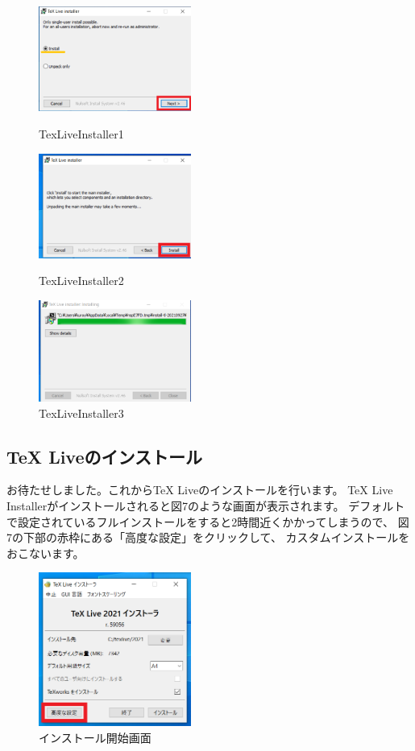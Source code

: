 \documentclass[dvipdfmx]{jsarticle}
\begin{document}
\begin{figure}[H]
    \begin{minipage}[b]{0.33\linewidth}
        \centering
        \includegraphics[width=5cm]{images/TeXLiveInstaller1.png}
        \caption{TexLiveInstaller1}
    \end{minipage}
    \begin{minipage}[b]{0.33\linewidth}
        \centering
        \includegraphics[width=5cm]{images/TeXLiveInstaller2.png}
        \caption{TexLiveInstaller2}
    \end{minipage}
    \begin{minipage}[b]{0.33\linewidth}
        \centering
        \includegraphics[width=5cm]{images/TeXLiveInstaller3.png}
        \caption{TexLiveInstaller3}
    \end{minipage}
\end{figure}

\subsection{TeX Liveのインストール}
お待たせしました。これからTeX Liveのインストールを行います。
TeX Live Installerがインストールされると図7のような画面が表示されます。
デフォルトで設定されているフルインストールをすると2時間近くかかってしまうので、
図7の下部の赤枠にある「高度な設定」をクリックして、
カスタムインストールをおこないます。

\begin{figure}[H]
        \centering
        \includegraphics[width=5cm]{images/TeXLive2021_1.png}
        \caption{インストール開始画面}
\end{figure}
\end{document}
